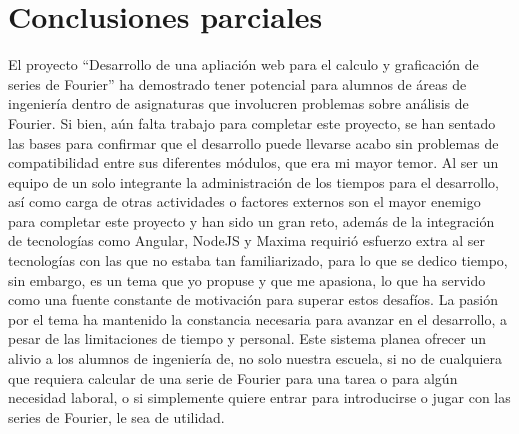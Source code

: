 \chapter{Conclusiones parciales}\label{ch:conclusiones}
El proyecto ``Desarrollo de una apliación web para el calculo y graficación de series de Fourier'' ha demostrado tener potencial para alumnos de áreas de ingeniería dentro de asignaturas que involucren problemas sobre análisis de Fourier. Si bien, aún falta trabajo para completar este proyecto, se han sentado las bases para confirmar que el desarrollo puede llevarse acabo sin problemas de compatibilidad entre sus diferentes módulos, que era mi mayor temor.
\newline
Al ser un equipo de un solo integrante la administración de los tiempos para el desarrollo, así como carga de otras actividades o factores externos son el mayor enemigo para completar este proyecto y han sido un gran reto, además de la integración de tecnologías como Angular, NodeJS y Maxima requirió esfuerzo extra al ser tecnologías con las que no estaba tan familiarizado, para lo que se dedico tiempo, sin embargo, es un tema que yo propuse y que me apasiona, lo que ha servido como una fuente constante de motivación para superar estos desafíos. La pasión por el tema ha mantenido la constancia necesaria para avanzar en el desarrollo, a pesar de las limitaciones de tiempo y personal.
\newline
Este sistema planea ofrecer un alivio a los alumnos de ingeniería de, no solo nuestra escuela, si no de cualquiera que requiera calcular de una serie de Fourier para una tarea o para algún necesidad laboral, o si simplemente quiere entrar para introducirse o jugar con las series de Fourier, le sea de utilidad.
